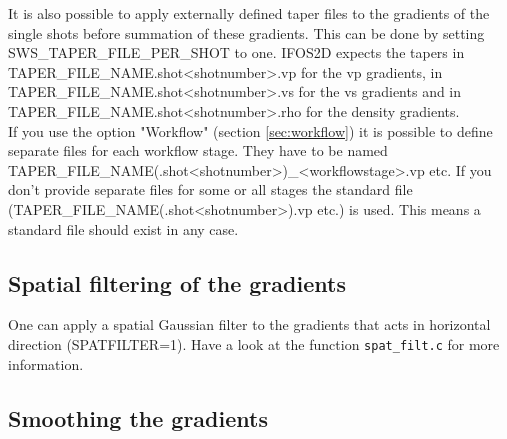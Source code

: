 It is also possible to apply externally defined taper files to the gradients of the single shots before summation of these gradients. This can be done by setting SWS\_TAPER\_FILE\_PER\_SHOT to one. IFOS2D expects the tapers in TAPER\_FILE\_NAME.shot<shotnumber>.vp for the vp gradients, in TAPER\_FILE\_NAME.shot<shotnumber>.vs for the vs gradients and in TAPER\_FILE\_NAME.shot<shotnumber>.rho for the density gradients.\\

If you use the option "Workflow" (section \ref{sec:workflow}) it is possible to define separate files for each workflow stage. They have to be named TAPER\_FILE\_NAME(.shot<shotnumber>)\_<workflowstage>.vp etc. If you don't provide separate files for some or all stages the standard file (TAPER\_FILE\_NAME(.shot<shotnumber>).vp etc.) is used. This means a standard file should exist in any case.

\subsection{Spatial filtering of the gradients}
{\color{blue}{\begin{verbatim}
"Definition of smoothing (spatial filtering) of the gradients" : "comment",
			"SPATFILTER" : "0",
			"SPAT_FILT_SIZE" : "40",
			"SPAT_FILT_1" : "1",
			"SPAT_FILT_ITER" : "1",
\end{verbatim}}}

{\color{red}{\begin{verbatim}
Default values are:
	SPATFILTER=0
\end{verbatim}}}

One can apply a spatial Gaussian filter to the gradients that acts in horizontal direction (SPATFILTER=1). Have a look at the function \texttt{spat\_filt.c} for more information.

\subsection{Smoothing the gradients}
{\color{blue}{\begin{verbatim}
"Definition of smoothing the gradients with a 2D-Gaussian filter" : "comment",
                        "GRAD_FILTER" : "0",
                        "FILT_SIZE_GRAD" : "5",
			"GRAD_FILT_WAVELENGTH" : "0",
			"A" : "0.0",
\end{verbatim}}}

{\color{red}{\begin{verbatim}
Default values are:
	GRAD_FILTER=0
	GRAD_FILT_WAVELENGTH=0
\end{verbatim}}}

